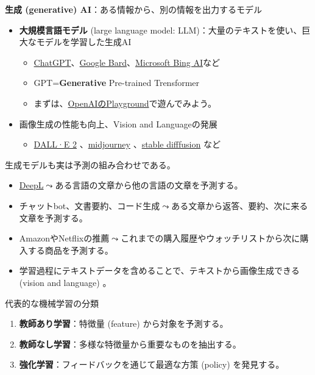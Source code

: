 \documentclass[
  xelatex,
  ja=standard]{bxjsarticle}
\providecommand{\tightlist}{%
  \setlength{\itemsep}{0pt}\setlength{\parskip}{0pt}}\usepackage{longtable,booktabs,array}
\begin{document}
\textbf{生成 (generative) AI}：ある情報から、別の情報を出力するモデル

\begin{itemize}
\tightlist
\item
  \textbf{大規模言語モデル} (large language model:
  LLM)：大量のテキストを使い、巨大なモデルを学習した生成AI

  \begin{itemize}
  \tightlist
  \item
    \href{https://openai.com/blog/chatgpt}{ChatGPT}、\href{https://bard.google.com/}{Google
    Bard}、\href{https://www.microsoft.com/ja-jp/bing}{Microsoft Bing
    AI}など
  \item
    GPT=\textbf{Generative} Pre-trained Trensformer
  \item
    まずは、\href{https://platform.openai.com/examples}{OpenAIのPlayground}で遊んでみよう。
  \end{itemize}
\item
  画像生成の性能も向上、Vision and Languageの発展

  \begin{itemize}
  \tightlist
  \item
    \href{https://openai.com/dall-e-2/}{DALL·E 2}
    、\href{https://www.midjourney.com/}{midjourney}
    、\href{https://huggingface.co/spaces/stabilityai/stable-diffusion}{stable
    difffusion} など
  \end{itemize}
\end{itemize}

生成モデルも実は予測の組み合わせである。

\begin{itemize}
\tightlist
\item
  \href{https://www.deepl.com/translator}{DeepL}\(\leadsto\)ある言語の文章から他の言語の文章を予測する。
\item
  チャットbot、文書要約、コード生成\(\leadsto\)ある文章から返答、要約、次に来る文章を予測する。
\item
  AmazonやNetflixの推薦\(\leadsto\)これまでの購入履歴やウォッチリストから次に購入する商品を予測する。
\item
  学習過程にテキストデータを含めることで、テキストから画像生成できる
  (vision and language) 。
\end{itemize}

代表的な機械学習の分類

\begin{enumerate}
\def\labelenumi{\arabic{enumi}.}
\tightlist
\item
  \textbf{教師あり学習}：特徴量 (feature) から対象を予測する。
\item
  \textbf{教師なし学習}：多様な特徴量から重要なものを抽出する。
\item
  \textbf{強化学習}：フィードバックを通じて最適な方策 (policy)
  を発見する。
\end{enumerate}
\end{document}
